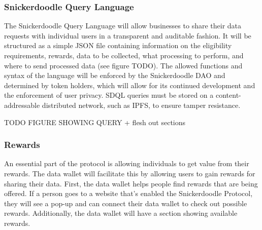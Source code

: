 \subsubsection{Snickerdoodle Query Language} %
\label{section:SDQL}
The Snickerdoodle Query Language will allow businesses to share their data requests with individual users in a transparent and auditable fashion. 
It will be structured as a simple JSON file containing information on the eligibility requirements, rewards, data to be collected, what processing 
to perform, and where to send processed data (see figure TODO). The allowed functions and syntax of the language will be enforced by the 
Snickerdoodle DAO and determined by token holders, which will allow for its continued development and the enforcement of user privacy. SDQL 
queries must be stored on a content-addressable distributed network, such as IPFS, to ensure tamper resistance. 

TODO FIGURE SHOWING QUERY + flesh out sections


\subsubsection{Rewards}

An essential part of the protocol is allowing individuals to get value from their rewards. The data wallet will facilitate this by allowing users 
to gain rewards for sharing their data. First, the data wallet helps people find rewards that are being offered. If a person goes to a website 
that's enabled the Snickerdoodle Protocol, they will see a pop-up and can connect their data wallet to check out possible rewards. Additionally, 
the data wallet will have a section showing available rewards.



